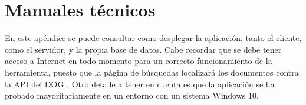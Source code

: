 \chapter{Manuales técnicos}

En este apéndice se puede consultar como desplegar la aplicación, tanto el cliente, como el servidor, y la propia base de datos. Cabe recordar que se debe tener acceso a Internet en todo momento para un correcto funcionamiento de la herramienta, puesto que la página de búsquedas localizará los documentos contra la API del DOG \cite{dog}. Otro detalle a tener en cuenta es que la aplicación se ha probado mayoritariamente en un entorno con un sistema Windows 10.


